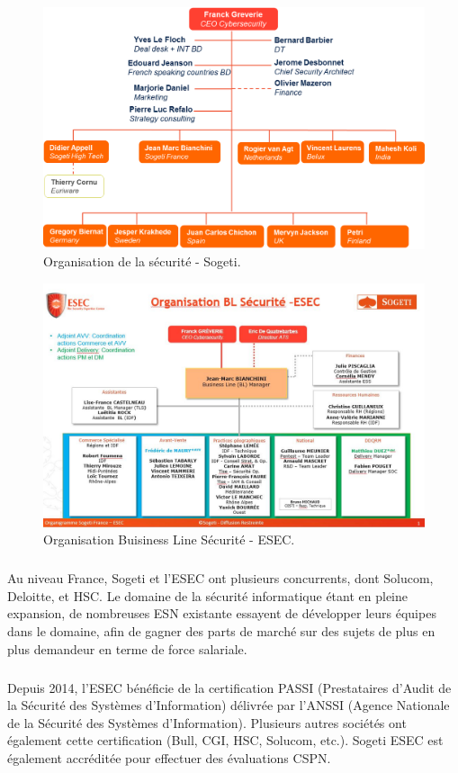 \begin{figure}[h]
    \centering
    \includegraphics[scale=0.5]{organigramme.png}
    \caption{Organisation de la sécurité - Sogeti.}
\end{figure}
\begin{figure}[h]
    \centering
    \includegraphics[scale=0.5]{bl-esec-orga.png}
    \caption{Organisation Buisiness Line Sécurité - ESEC.}
\end{figure}

\subparagraph{}
Au niveau France, Sogeti et l'ESEC ont plusieurs concurrents, dont Solucom, Deloitte,
et HSC. Le domaine de la sécurité informatique étant en pleine expansion, de nombreuses ESN existante
essayent de développer leurs équipes dans le domaine, afin de gagner des parts de marché
sur des sujets de plus en plus demandeur en terme de force salariale.

\subparagraph{}
Depuis 2014, l'ESEC bénéficie de la certification PASSI (Prestataires d'Audit de la Sécurité
des Systèmes d'Information) délivrée par l'ANSSI (Agence Nationale de la Sécurité des Systèmes
d'Information). Plusieurs autres sociétés ont également cette certification (Bull, CGI, HSC, Solucom, etc.).
Sogeti ESEC est également accréditée pour effectuer des évaluations CSPN.

